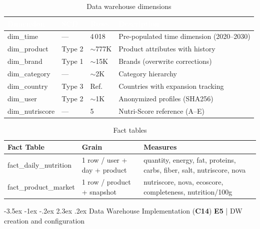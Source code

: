 \documentclass[a4paper,11pt,oneside,openany]{report}
\makeatletter
\renewcommand\section{\@startsection{section}{1}{\z@}%
  {-3.5ex \@plus -1ex \@minus -.2ex}%
  {2.3ex \@plus.2ex}%
  {\normalfont\Large\bfseries\color{ntgreen}}}
\newcommand{\competence}[1]{\textbf{\textcolor{ntgreen}{#1}}}
\newcommand{\evaluation}[1]{\textbf{\textcolor{ntblue}{#1}}}
\makeatother
\begin{document}
\begin{table}[H]
\centering
\caption{Data warehouse dimensions}
\label{tab:dimensions}
\begin{tabularx}{\textwidth}{L{2.5cm} C{1.5cm} C{1.2cm} L{6.5cm}}
\toprule
{}
\textcolor{white}{\textbf{Dimension}} & \textcolor{white}{\textbf{SCD}} & \textcolor{white}{\textbf{Rows}} & \textcolor{white}{\textbf{Description}} \\
\midrule
dim\_time & --- & 4\,018 & Pre-populated time dimension (2020--2030) \\
dim\_product & Type 2 & $\sim$777K & Product attributes with history \\
dim\_brand & Type 1 & $\sim$15K & Brands (overwrite corrections) \\
dim\_category & --- & $\sim$2K & Category hierarchy \\
dim\_country & Type 3 & Ref. & Countries with expansion tracking \\
dim\_user & Type 2 & $\sim$1K & Anonymized profiles (SHA256) \\
dim\_nutriscore & --- & 5 & Nutri-Score reference (A--E) \\
\bottomrule
\end{tabularx}
\end{table}

\begin{table}[H]
\centering
\caption{Fact tables}
\label{tab:facts}
\begin{tabularx}{\textwidth}{L{3.5cm} L{4cm} L{5.5cm}}
\toprule
\textbf{Fact Table} & \textbf{Grain} & \textbf{Measures} \\
\midrule
fact\_daily\_nutrition & 1 row / user + day + product & quantity, energy, fat, proteins, carbs, fiber, salt, nutriscore, nova \\
fact\_product\_market & 1 row / product + snapshot & nutriscore, nova, ecoscore, completeness, nutrition/100g \\
\bottomrule
\end{tabularx}
\end{table}


\section{Data Warehouse Implementation (\competence{C14})}
\label{sec:c14}
{\small\evaluation{E5} | DW creation and configuration}
\end{document}
